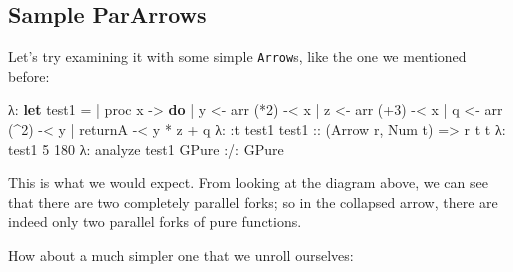 \documentclass[]{article}
\newenvironment{Shaded}{}{}
\newcommand{\KeywordTok}[1]{\textcolor[rgb]{0.00,0.44,0.13}{\textbf{{#1}}}}
\newcommand{\DataTypeTok}[1]{\textcolor[rgb]{0.56,0.13,0.00}{{#1}}}
\newcommand{\DecValTok}[1]{\textcolor[rgb]{0.25,0.63,0.44}{{#1}}}
\newcommand{\OtherTok}[1]{\textcolor[rgb]{0.00,0.44,0.13}{{#1}}}
\newcommand{\FunctionTok}[1]{\textcolor[rgb]{0.02,0.16,0.49}{{#1}}}
\newcommand{\NormalTok}[1]{{#1}}
\begin{document}
\subsection{Sample ParArrows}\label{sample-pararrows}

Let's try examining it with some simple \texttt{Arrow}s, like the one we
mentioned before:

\begin{Shaded}
\begin{Highlighting}[]
\NormalTok{λ}\FunctionTok{:} \KeywordTok{let} \NormalTok{test1 }\FunctionTok{=}
 \FunctionTok{|}       \NormalTok{proc x }\OtherTok{->} \KeywordTok{do}
 \FunctionTok{|}       \NormalTok{y }\OtherTok{<-} \NormalTok{arr (}\FunctionTok{*}\DecValTok{2}\NormalTok{) }\FunctionTok{-<} \NormalTok{x}
 \FunctionTok{|}       \NormalTok{z }\OtherTok{<-} \NormalTok{arr (}\FunctionTok{+}\DecValTok{3}\NormalTok{) }\FunctionTok{-<} \NormalTok{x}
 \FunctionTok{|}       \NormalTok{q }\OtherTok{<-} \NormalTok{arr (}\FunctionTok{^}\DecValTok{2}\NormalTok{) }\FunctionTok{-<} \NormalTok{y}
 \FunctionTok{|}       \NormalTok{returnA }\FunctionTok{-<} \NormalTok{y }\FunctionTok{*} \NormalTok{z }\FunctionTok{+} \NormalTok{q}
\NormalTok{λ}\FunctionTok{:} \FunctionTok{:}\NormalTok{t test1}
\OtherTok{test1 ::} \NormalTok{(}\DataTypeTok{Arrow} \NormalTok{r, }\DataTypeTok{Num} \NormalTok{t) }\OtherTok{=>} \NormalTok{r t t}
\NormalTok{λ}\FunctionTok{:} \NormalTok{test1 }\DecValTok{5}
\DecValTok{180}
\NormalTok{λ}\FunctionTok{:} \NormalTok{analyze test1}
\DataTypeTok{GPure} \FunctionTok{:/:} \DataTypeTok{GPure}
\end{Highlighting}
\end{Shaded}

This is what we would expect. From looking at the diagram above, we can
see that there are two completely parallel forks; so in the collapsed
arrow, there are indeed only two parallel forks of pure functions.

How about a much simpler one that we unroll ourselves:
\end{document}
